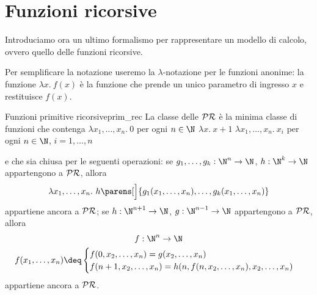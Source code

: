 \section{Funzioni ricorsive}

Introduciamo ora un ultimo formalismo per rappresentare un modello di calcolo, ovvero quello delle funzioni ricorsive.

Per semplificare la notazione useremo la $\lambda$-notazione per le funzioni anonime: la funzione $\lambda x.\ f(x)$ è la funzione che prende un unico parametro di ingresso $x$ e restituisce $f(x)$.   

\begin{definition}
    {Funzioni primitive ricorsive}{prim_rec}
    La classe delle  $\mathcal{PR}$ è la minima classe di funzioni che contenga
     $\lambda x_1, \dots, x_n.\ 0$ \quad per ogni $n \in \N$ 
     $\lambda x.\ x+1$
     $\lambda x_1, \dots, x_n.\ x_i$ \quad per ogni $n \in \N$, $i = 1, \dots, n$

    \medskip
    e che sia chiusa per le seguenti operazioni:
     se $g_1, \dots, g_k : \N^n \to \N$, $h : \N^k \to \N$ appartengono a $\mathcal{PR}$, allora \[
        \lambda x_1, \dots, x_n.\ h\parens[\Big]{g_1(x_1, \dots, x_n), \dots, g_k(x_1, \dots, x_n)}
    \] appartiene ancora a $\mathcal{PR}$;
     se $h : \N^{n+1} \to \N$, $g : \N^{n-1} \to \N$ appartengono a $\mathcal{PR}$, allora \begin{gather*}
        f : \N^n \to \N \\
        f(x_1, \dots, x_n) \deq \begin{cases}
            f(0, x_2, \dots, x_n) = g(x_2, \dots, x_n)\\
            f(n+1, x_2, \dots, x_n) = h(n, f(n, x_2, \dots, x_n), x_2, \dots, x_n)
        \end{cases}
    \end{gather*}   
    appartiene ancora a $\mathcal{PR}$. 
\end{definition}